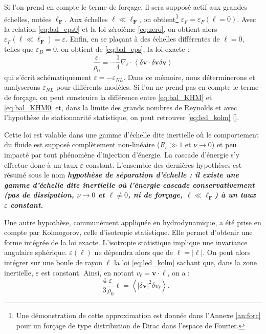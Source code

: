 Si l'on prend en compte le terme de forçage, il sera supposé actif aux grandes échelles, notées $\boldsymbol{\ell_F} $. Aux échelles $\boldsymbol{\ell} \ll \boldsymbol{\ell_F}$, on obtient\footnote{Une démonstration de cette approximation est donnée dans l'Annexe \ref{an:forc} pour un forçage de type distribution de Dirac dans l'espace de Fourier.} $\varepsilon_{F} = \varepsilon_{F}(\boldsymbol{\ell} =0)$.  Avec la relation \eqref{eq:bal_eps0} et la loi zéroième \eqref{eq:zero}, on obtient alors $\varepsilon_{F}(\boldsymbol{\ell} \ll \boldsymbol{\ell_F}) = \varepsilon$. Enfin, en se plaçant à des échelles différentes de $\boldsymbol{\ell} =0$, telles que $\varepsilon_{D}=0$, on obtient de \eqref{eq:bal_eps}, la loi exacte  : 
 \begin{equation}
  \label{eq:led_kolm} \frac{\varepsilon}{\rho_0} = - \frac{1}{4} \nabla_{\boldsymbol{\ell}} \cdot \left<\delta \boldsymbol{v} \cdot \delta \boldsymbol{v} \delta \boldsymbol{v}\right>
 \end{equation}
 qui s'écrit schématiquement $\varepsilon=-\varepsilon_{NL}$. Dans ce mémoire, nous déterminerons et analyserons $\varepsilon_{NL}$ pour différents modèles. Si l'on ne prend pas en compte le terme de forçage, on peut construire la différence entre \eqref{eq:bal_KHM} et \eqref{eq:bal_KHM0} et, dans la limite des grands nombres de Reynolds et avec l'hypothèse de stationnarité statistique, on peut retrouver \eqref{eq:led_kolm} [\cite{antonia_analogy_1997}]. 
 
 Cette loi est valable dans une gamme d'échelle dite inertielle où le comportement du fluide est supposé complètement non-linéaire ($R_e \gg 1$ et $\nu \rightarrow 0$) et peu impacté par tout phénomène d'injection d'énergie. La cascade d'énergie s'y effectue donc à un taux $\varepsilon$ constant. L'ensemble des dernières hypothèses est résumé sous le nom \textbf{\emph{\og hypothèse de séparation d'échelle \fg{} : 
 il existe une gamme d'échelle dite inertielle où l'énergie cascade conservativement (pas de dissipation, $\nu \rightarrow 0$ et $\boldsymbol{\ell} \neq 0$, ni de forçage, $\boldsymbol{\ell} \ll \boldsymbol{\ell_F}$) à un taux $\varepsilon$ constant.}} 
 
 Une autre hypothèse, communément appliquée en hydrodynamique, a été prise en compte par Kolmogorov, celle d'isotropie statistique. Elle permet d'obtenir une forme intégrée de la loi exacte. L'isotropie statistique implique une invariance angulaire sphérique. $\varepsilon(\boldsymbol{\ell})$ ne dépendra alors que de $\ell = |\boldsymbol{\ell}|$. On peut alors intégrer sur une boule de rayon $\ell$ la loi \eqref{eq:led_kolm} sachant que, dans la zone inertielle, $\varepsilon$ est constant. Ainsi, en notant $v_{\ell} = \boldsymbol{v} \cdot \boldsymbol{\ell}$, on a : 
 \begin{equation}
   \label{eq:kolmogorov}  - \frac{4}{3} \frac{\varepsilon}{\rho_0} \ell = \left<|\delta \boldsymbol{v}|^2 \delta v_{\ell}\right>.
 \end{equation}
 
